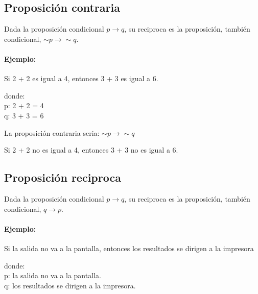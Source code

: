 \documentclass[a4paper,11pt,oneside,titlepage,final]{scrartc}
\begin{document}
\subsection{Proposición contraria}

Dada la proposición condicional $p \longrightarrow q$, su reciproca es la proposición, también condicional, $ \sim p \longrightarrow \sim q$.

\paragraph{Ejemplo:}

\begin{center}
Si 2 + 2 es igual a 4, entonces 3 + 3 es igual a 6.
\end{center}

\begin{flushleft}
donde:\\
p: 2 + 2 = 4\\
q: 3 + 3 = 6\\
\end{flushleft}

\begin{flushleft}
La proposición contraria seria: $ \sim p \longrightarrow \sim q$\\
\end{flushleft}

\begin{center}
Si 2 + 2 no es igual a 4, entonces 3 + 3 no es igual a 6.
\end{center}

\subsection{Proposición reciproca}

Dada la proposición condicional $p \longrightarrow q$, su reciproca es la proposición, también condicional, $q \longrightarrow p$.

\paragraph{Ejemplo:}

\begin{center}
Si la salida no va a la pantalla, entonces los resultados se dirigen a la impresora
\end{center}

\begin{flushleft}
donde:\\
p: la salida no va a la pantalla.\\
q: los resultados se dirigen a la impresora.\\
\end{flushleft}
\end{document}
